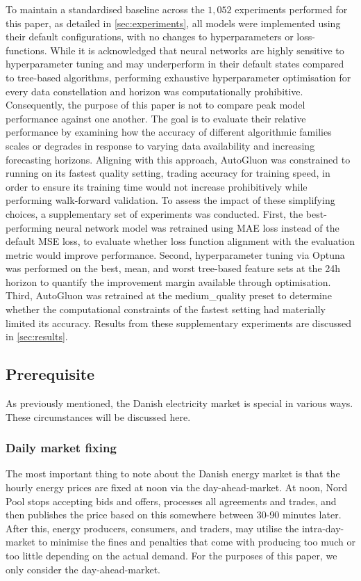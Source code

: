 To maintain a standardised baseline across the $1,052$ experiments performed 
for this paper, as detailed in \autoref{sec:experiments}, all models were 
implemented using their default configurations, with no changes to 
hyperparameters or loss-functions. While it is acknowledged that neural 
networks are highly sensitive to hyperparameter tuning and may underperform in 
their default states compared to tree-based algorithms, performing exhaustive 
hyperparameter optimisation for every data 
constellation and horizon was 
computationally prohibitive. Consequently, the purpose of this paper is not 
to compare peak model performance against one another. The goal is to 
evaluate their relative performance by examining how the accuracy of 
different algorithmic families scales or degrades in response to varying data 
availability and increasing forecasting horizons. Aligning with this approach, 
AutoGluon was constrained to running on its fastest quality setting, trading 
accuracy for training speed, in order to ensure its training time would not 
increase prohibitively while performing 
walk-forward validation. To assess the impact of 
these simplifying choices, a supplementary set of 
experiments was conducted. First, the 
best-performing neural network model was retrained 
using MAE loss instead of the default MSE loss, to 
evaluate whether loss function alignment with the 
evaluation metric would improve performance. 
Second, hyperparameter tuning via Optuna was 
performed on the best, mean, and worst tree-based 
feature sets at the 24h horizon to quantify the 
improvement margin available through optimisation. 
Third, AutoGluon was retrained at the 
medium\_quality preset to determine whether the 
computational constraints of the fastest setting 
had materially limited its accuracy. Results from 
these supplementary experiments are discussed in 
\autoref{sec:results}.

\subsection{Prerequisite}\label{sec:prereq}
As previously mentioned, the Danish electricity 
market is special in various 
ways. These circumstances will be discussed here.
\subsubsection{Daily market fixing}
The most important thing to note about the Danish energy market is that the 
hourly energy prices are fixed at noon via the day-ahead-market. At noon, Nord 
Pool stops accepting bids and offers, processes all agreements and trades, and 
then publishes the price based on this somewhere between 30-90 minutes later. 
After this, energy producers, consumers, and 
traders, may utilise the 
intra-day-market to minimise the fines and 
penalties that come with producing 
too much or too little depending on the actual demand. For the purposes of this 
paper, we only consider the day-ahead-market.
